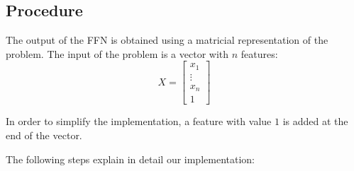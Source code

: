 \subsection*{Procedure}

The output of the FFN is obtained
using a matricial representation of the problem.
The input of the problem is a vector with $n$ features:
\[
  X =
  \begin{bmatrix}
    x_1    \\
    \vdots \\
    x_n    \\
    1
  \end{bmatrix}
\]

In order to simplify the implementation, a feature with value $1$ is added at the end of the vector.

The following steps explain in detail our implementation:

